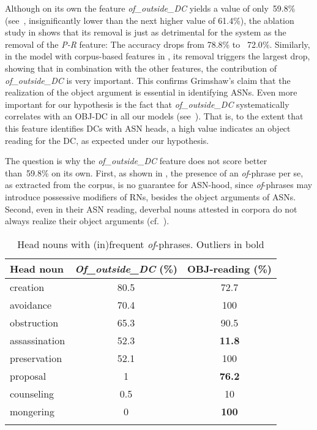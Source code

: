 \documentclass[output=paper]{langsci/langscibook}
\begin{document}
Although on its own the feature \textit{of\_outside\_DC} yields a value of only~59.8\% (see~, insignificantly lower than the  {next higher value of} 61.4\%), the ablation study in  shows that its removal is just as detrimental for the system as the removal of the \textit{P-R} feature: The accuracy drops from 78.8\% to~ {72.0}\%. Similarly, in the model with corpus-based features in , its removal triggers the largest drop, showing that in combination with the other features, the contribution of \textit{of\_outside\_DC} is very important. This confirms Grimshaw's claim that the realization of the object argument is essential in identifying ASNs. Even more important for our hypothesis is the fact that \textit{\textit{of}\_outside\_DC} systematically correlates with an OBJ-DC in all our models (see~). That is, to the extent that this feature identifies DCs with ASN heads, a high value indicates an object reading for the DC, as expected under our hypothesis.


The question is why the \textit{of\_outside\_DC} feature  does not score better than~59.8\% on its own.  {First, as shown in , the presence of an \textit{of}-phrase per se, as extracted from the corpus, is no guarantee for ASN-hood, since \textit{of}-phrases may introduce possessive modifiers of RNs, besides the object arguments of ASNs. Second,} even in their ASN reading, deverbal nouns attested in corpora do not always realize their object arguments (cf.~\cite{grimm:mcnally:13}). 

  
\begin{table}
\caption{\label{tab:ex:of:phrases}Head nouns with (in)frequent \textit{of}-phrases. Outliers in bold}
\begin{tabular}{lSS}
\lsptoprule
{Head noun}& {\textit{Of\_outside\_DC} (\%)}& {OBJ-reading (\%)}\\
\midrule
creation&80.5&72.7\\ 
avoidance&70.4&100\\
obstruction&65.3&90.5\\   
assassination&52.3&\bfseries 11.8\\ 
preservation&52.1&100\\   
proposal&1&\bfseries 76.2\\ 
counseling&0.5&10\\
mongering&0& \bfseries 100\\
\lspbottomrule
\end{tabular}
\end{table}
\end{document}
